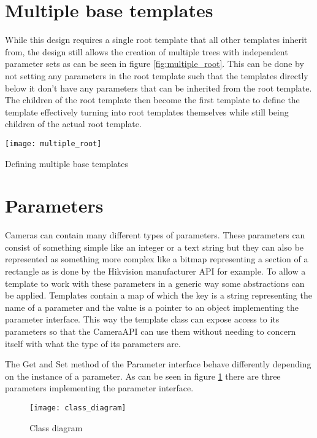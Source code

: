 \section{Multiple base templates} %
While this design requires a single root template that all other templates inherit from, the design still allows the creation of multiple trees with independent parameter sets as can be seen in figure \ref{fig:multiple_root}.
This can be done by not setting any parameters in the root template such that the templates directly below it don't have any parameters that can be inherited from the root template.
The children of the root template then become the first template to define the template effectively turning into root templates themselves while still being children of the actual root template.
\begin{marginfigure}
	\centering
	\texttt{[image: multiple\_root]}
	\caption{Defining multiple base templates}
	\label{fig:multiple_root}
\end{marginfigure}

\section{Parameters}
Cameras can contain many different types of parameters.
These parameters can consist of something simple like an integer or a text string but they can also be represented as something more complex like a bitmap representing a section of a rectangle as is done by the Hikvision manufacturer API for example.
 To allow a template to work with these parameters in a generic way some abstractions can be applied.
Templates contain a map of which the key is a string representing the name of a parameter and the value is a pointer to an object implementing the parameter interface.
This way the template class can expose access to its parameters so that the CameraAPI can use them without needing to concern itself with what the type of its parameters are.


The Get and Set method of the Parameter interface behave differently depending on the instance of a parameter.
As can be seen in figure \ref{fig:class_diagram} there are three parameters implementing the parameter interface.

\begin{figure}[h!]
	\centering
	\texttt{[image: class\_diagram]}
	\caption{Class diagram}
	\label{fig:class_diagram}
\end{figure}

